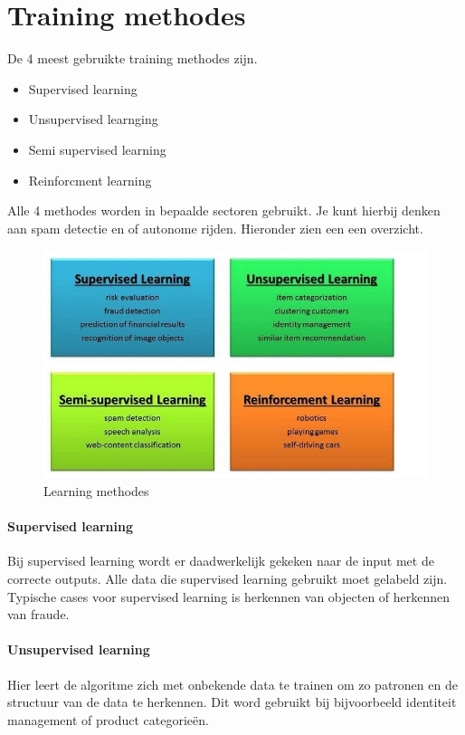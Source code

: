 \documentclass{article}
\begin{document}
\section{Training methodes}
De 4 meest gebruikte training methodes zijn\cite{lm}.
\begin{itemize}
    \item Supervised learning
    \item Unsupervised learnging
    \item Semi supervised learning
    \item Reinforcment learning
\end{itemize}
Alle 4 methodes worden in bepaalde sectoren gebruikt. Je kunt hierbij denken aan spam detectie en of autonome rijden. Hieronder zien een een overzicht.
\begin{figure}[h!]
  \centering
  \includegraphics[scale=0.35]{lm.png}
  \caption{Learning methodes}
\end{figure}

\paragraph{Supervised learning}

Bij supervised learning wordt er daadwerkelijk gekeken naar de input met de correcte outputs. Alle data die supervised learning gebruikt moet gelabeld zijn. Typische cases voor supervised learning is herkennen van objecten of herkennen van fraude.
\paragraph{Unsupervised learning}
Hier leert de algoritme zich met onbekende data te trainen om zo patronen en de structuur van de data te herkennen. Dit word gebruikt bij bijvoorbeeld identiteit management of product categorieën.
\end{document}
